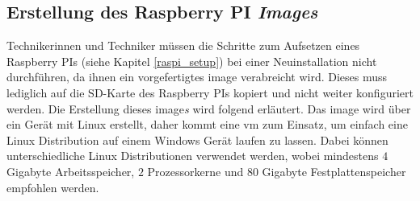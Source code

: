 \subsection{Erstellung des Raspberry PI \textit{Images}}
Technikerinnen und Techniker müssen die Schritte zum Aufsetzen eines Raspberry PIs (siehe Kapitel \ref{raspi_setup}) bei einer Neuinstallation nicht durchführen, da ihnen ein vorgefertigtes \gls{image} verabreicht wird. Dieses muss lediglich auf die SD-Karte des Raspberry PIs kopiert und nicht weiter konfiguriert werden. Die Erstellung dieses \gls{image}\textit{s} wird folgend erläutert. Das \gls{image} wird über ein Gerät mit Linux erstellt, daher kommt eine \ac{vm} zum Einsatz, um einfach eine Linux Distribution auf einem Windows Gerät laufen zu lassen. Dabei können unterschiedliche Linux Distributionen verwendet werden, wobei mindestens $4$ Gigabyte Arbeitsspeicher, $2$ Prozessorkerne und $80$ Gigabyte Festplattenspeicher empfohlen werden. 

